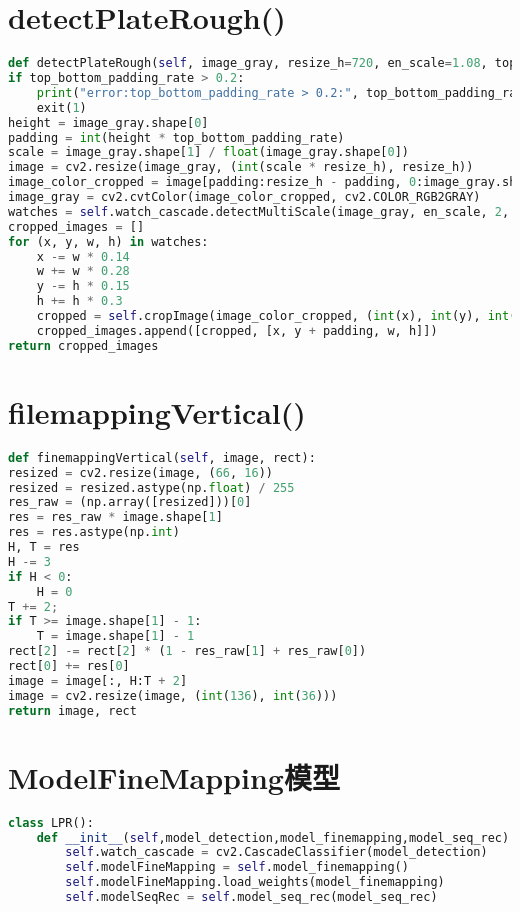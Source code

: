 \section{detectPlateRough()}\label{apdx:detectPlateRough}
\begin{lstlisting}[language=python]
def detectPlateRough(self, image_gray, resize_h=720, en_scale=1.08, top_bottom_padding_rate=0.05):
if top_bottom_padding_rate > 0.2:
	print("error:top_bottom_padding_rate > 0.2:", top_bottom_padding_rate)
	exit(1)
height = image_gray.shape[0]
padding = int(height * top_bottom_padding_rate)
scale = image_gray.shape[1] / float(image_gray.shape[0])
image = cv2.resize(image_gray, (int(scale * resize_h), resize_h))
image_color_cropped = image[padding:resize_h - padding, 0:image_gray.shape[1]]
image_gray = cv2.cvtColor(image_color_cropped, cv2.COLOR_RGB2GRAY)
watches = self.watch_cascade.detectMultiScale(image_gray, en_scale, 2, minSize=(36, 9), maxSize=(36 * 40, 9 * 40))
cropped_images = []
for (x, y, w, h) in watches:
	x -= w * 0.14
	w += w * 0.28
	y -= h * 0.15
	h += h * 0.3
	cropped = self.cropImage(image_color_cropped, (int(x), int(y), int(w), int(h)))
	cropped_images.append([cropped, [x, y + padding, w, h]])
return cropped_images
\end{lstlisting}

\section{filemappingVertical()}\label{apdx:filemappingVertical}
\begin{lstlisting}[language=python]
def finemappingVertical(self, image, rect):
resized = cv2.resize(image, (66, 16))
resized = resized.astype(np.float) / 255
res_raw = (np.array([resized]))[0]
res = res_raw * image.shape[1]
res = res.astype(np.int)
H, T = res
H -= 3
if H < 0:
	H = 0
T += 2;
if T >= image.shape[1] - 1:
	T = image.shape[1] - 1
rect[2] -= rect[2] * (1 - res_raw[1] + res_raw[0])
rect[0] += res[0]
image = image[:, H:T + 2]
image = cv2.resize(image, (int(136), int(36)))
return image, rect
\end{lstlisting}

\section{ModelFineMapping模型}\label{apdx:ModelFineMapping}
\begin{lstlisting}[language=python]
class LPR():
    def __init__(self,model_detection,model_finemapping,model_seq_rec):
        self.watch_cascade = cv2.CascadeClassifier(model_detection)
        self.modelFineMapping = self.model_finemapping()
        self.modelFineMapping.load_weights(model_finemapping)
        self.modelSeqRec = self.model_seq_rec(model_seq_rec)
\end{lstlisting}

